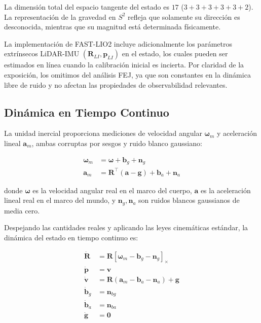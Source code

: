 La dimensión total del espacio tangente del estado es $17$ ($3+3+3+3+3+2$). La
representación de la gravedad en $S^2$ refleja que solamente su dirección es
desconocida, mientras que su magnitud está determinada físicamente.

\begin{remark}
La implementación de FAST-LIO2 incluye adicionalmente los parámetros extrínsecos
LiDAR-IMU $(\mathbf{R}_{LI}, \mathbf{p}_{LI})$ en el estado, los cuales pueden
ser estimados en línea cuando la calibración inicial es incierta. Por claridad
de la exposición, los omitimos del análisis FEJ, ya que son constantes en la
dinámica libre de ruido y no afectan las propiedades de observabilidad
relevantes.
\end{remark}

\subsection{Dinámica en Tiempo Continuo}
\label{sec:fej-dinamica-continua}

La unidad inercial proporciona mediciones de velocidad angular
$\boldsymbol{\omega}_m$ y aceleración lineal $\mathbf{a}_m$, ambas corruptas por
sesgos y ruido blanco gaussiano:

\begin{align}
\boldsymbol{\omega}_m &= \boldsymbol{\omega} + \mathbf{b}_g + \mathbf{n}_g
\label{eq:imu-gyro} \\
\mathbf{a}_m &= \mathbf{R}^\top (\mathbf{a} - \mathbf{g}) + \mathbf{b}_a + \mathbf{n}_a
\label{eq:imu-accel}
\end{align}

donde $\boldsymbol{\omega}$ es la velocidad angular real en el marco del cuerpo,
$\mathbf{a}$ es la aceleración lineal real en el marco del mundo, y
$\mathbf{n}_g, \mathbf{n}_a$ son ruidos blancos gaussianos de media cero.

Despejando las cantidades reales y aplicando las leyes cinemáticas estándar, la
dinámica del estado en tiempo continuo es:

\begin{align}
\dot{\mathbf{R}} &= \mathbf{R} [\boldsymbol{\omega}_m - \mathbf{b}_g - \mathbf{n}_g]_\times
\label{eq:rot-dot} \\
\dot{\mathbf{p}} &= \mathbf{v}
\label{eq:pos-dot} \\
\dot{\mathbf{v}} &= \mathbf{R} (\mathbf{a}_m - \mathbf{b}_a - \mathbf{n}_a) + \mathbf{g}
\label{eq:vel-dot} \\
\dot{\mathbf{b}}_g &= \mathbf{n}_{bg}
\label{eq:bg-dot} \\
\dot{\mathbf{b}}_a &= \mathbf{n}_{ba}
\label{eq:ba-dot} \\
\dot{\mathbf{g}} &= \mathbf{0}
\label{eq:g-dot}
\end{align}

